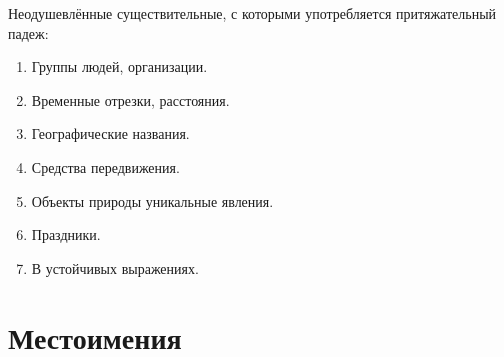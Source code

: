 \documentclass[oneside]{book}
\begin{document}
\begin{enumerate}
        Неодушевлённые существительные,
        с которыми употребляется
        притяжательный падеж:
        \begin{enumerate}
            \item Группы людей, организации.
            \item Временные отрезки, расстояния.
            \item Географические названия.
            \item Средства передвижения.
            \item Объекты природы уникальные явления.
            \item Праздники.
            \item В устойчивых выражениях.
        \end{enumerate}
    \end{enumerate}

    \chapter{Местоимения}
\end{document}
